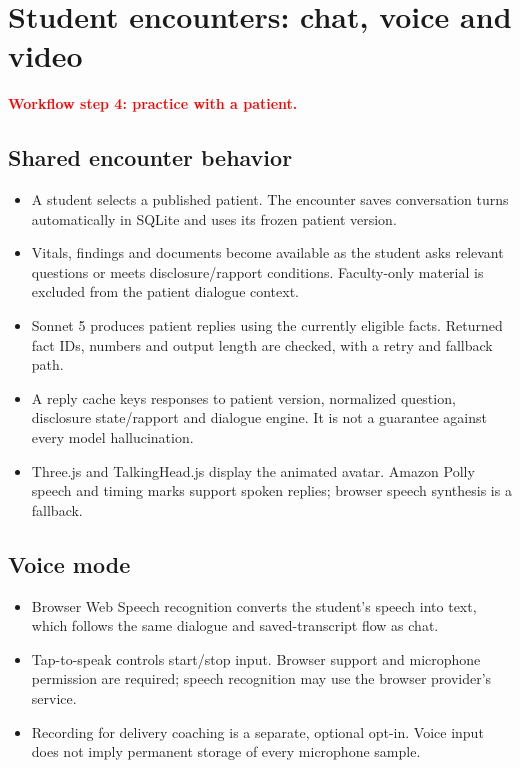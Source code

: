 \documentclass[10pt,letterpaper]{article}
\newcommand{\page}[2]{\clearpage\section{#1}\textcolor{red}{\textbf{#2}}\par}
\begin{document}
\page{Student encounters: chat, voice and video}{Workflow step 4: practice with a patient.}
\subsection*{Shared encounter behavior}
\begin{itemize}
\item A student selects a published patient. The encounter saves conversation turns automatically in SQLite and uses its frozen patient version.
\item Vitals, findings and documents become available as the student asks relevant questions or meets disclosure/rapport conditions. Faculty-only material is excluded from the patient dialogue context.
\item Sonnet 5 produces patient replies using the currently eligible facts. Returned fact IDs, numbers and output length are checked, with a retry and fallback path.
\item A reply cache keys responses to patient version, normalized question, disclosure state/rapport and dialogue engine. It is not a guarantee against every model hallucination.
\item Three.js and TalkingHead.js display the animated avatar. Amazon Polly speech and timing marks support spoken replies; browser speech synthesis is a fallback.
\end{itemize}
\subsection*{Voice mode}
\begin{itemize}
\item Browser Web Speech recognition converts the student's speech into text, which follows the same dialogue and saved-transcript flow as chat.
\item Tap-to-speak controls start/stop input. Browser support and microphone permission are required; speech recognition may use the browser provider's service.
\item Recording for delivery coaching is a separate, optional opt-in. Voice input does not imply permanent storage of every microphone sample.
\end{itemize}
\end{document}
